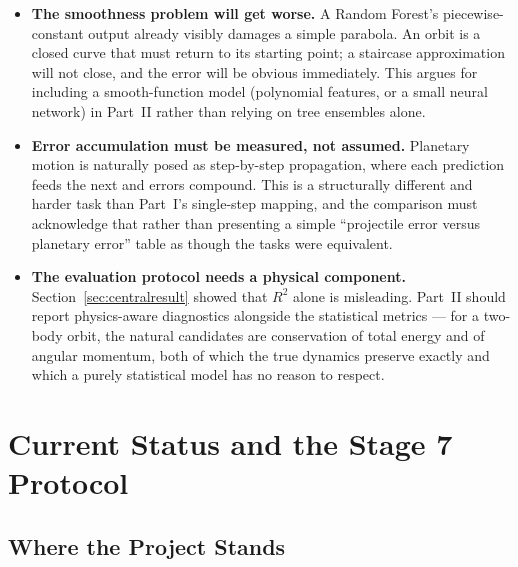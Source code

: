 \documentclass[11pt,a4paper]{article}
\newcommand{\Rsq}{R^{2}}
\begin{document}
\begin{itemize}[leftmargin=2em,itemsep=0.25em]
  \item \textbf{The smoothness problem will get worse.} A Random Forest's piecewise-constant output
        already visibly damages a simple parabola. An orbit is a closed curve that must return to its
        starting point; a staircase approximation will not close, and the error will be obvious
        immediately. This argues for including a smooth-function model (polynomial features, or a
        small neural network) in Part~II rather than relying on tree ensembles alone.
  \item \textbf{Error accumulation must be measured, not assumed.} Planetary motion is naturally
        posed as step-by-step propagation, where each prediction feeds the next and errors compound.
        This is a structurally different and harder task than Part~I's single-step mapping, and the
        comparison must acknowledge that rather than presenting a simple ``projectile error versus
        planetary error'' table as though the tasks were equivalent.
  \item \textbf{The evaluation protocol needs a physical component.}
        Section~\ref{sec:centralresult} showed that $\Rsq$ alone is misleading. Part~II should report
        physics-aware diagnostics alongside the statistical metrics --- for a two-body orbit, the
        natural candidates are conservation of total energy and of angular momentum, both of which
        the true dynamics preserve exactly and which a purely statistical model has no reason to
        respect.
\end{itemize}

\section{Current Status and the Stage 7 Protocol}\label{sec:stage7}

\subsection{Where the Project Stands}
\end{document}
